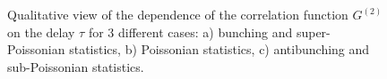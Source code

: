 \begin{figure}
\centering



\caption{Qualitative view of the dependence of the correlation function $G^{(2)}$ on the delay
  $\tau$ for 3 different cases: a) bunching and
  super-Poissonian statistics, b) Poissonian statistics, c)
  antibunching and sub-Poissonian statistics. }
\label{figPart3Nonclass3}
\end{figure}
